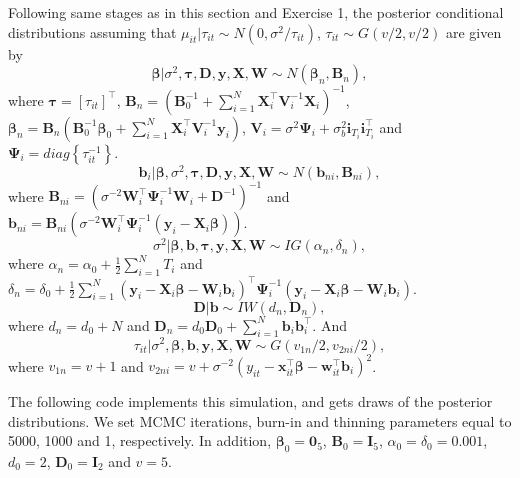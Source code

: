 Following same stages as in this section and Exercise 1, the posterior conditional distributions assuming that $\mu_{it}|\tau_{it}\sim N(0, \sigma^2/\tau_{it})$, $\tau_{it}\sim G(v/2,v/2)$ are given by 
\begin{equation*}
	\bm{\beta}|\sigma^2,\bm{\tau},\bm{D},\bm{y}, \bm{X}, \bm{W} \sim {N}(\bm{\beta}_n,\bm{B}_n), 
\end{equation*}
where $\bm{\tau}=[\tau_{it}]^{\top}$, $\bm{B}_n = (\bm{B}_0^{-1} +\sum_{i=1}^N \bm{X}_i^{\top}\bm{V}_i^{-1}\bm{X}_i)^{-1}$, $\bm{\beta}_n= \bm{B}_n(\bm{B}_0^{-1}\bm{\beta}_0 + \sum_{i=1}^N\bm{X}_i^{\top}\bm{V}_i^{-1}\bm{y}_i)$, $\bm{V}_i=\sigma^2\bm{\Psi}_i+\sigma_{b}^2\bm{i}_{T_i}\bm{i}_{T_i}^{\top}$ and $\bm{\Psi}_i=diag\left\{\tau_{it}^{-1}\right\}$.
\begin{equation*}
	\bm{b}_i|\bm{\beta},\sigma^2,\bm{\tau},\bm{D},\bm{y}, \bm{X}, \bm{W} \sim {N}(\bm{b}_{ni},\bm{B}_{ni}), 
\end{equation*} 
where $\bm{B}_{ni}=(\sigma^{-2}\bm{W}_i^{\top}\bm{\Psi}_i^{-1}\bm{W}_i+\bm{D}^{-1})^{-1}$ and $\bm{b}_{ni}=\bm{B}_{ni}(\sigma^{-2}\bm{W}_i^{\top}\bm{\Psi}_i^{-1}(\bm{y}_i-\bm{X}_i\bm{\beta}))$.
\begin{equation*}
	\sigma^2| \bm{\beta}, \bm{b}, \bm{\tau}, \bm{y}, \bm{X}, \bm{W} \sim {I}{G}(\alpha_n, \delta_n),
\end{equation*}
where $\alpha_n=\alpha_0+\frac{1}{2}\sum_{i=1}^N T_i$ and $\delta_n=\delta_0+\frac{1}{2}\sum_{i=1}^N(\bm{y}_i-\bm{X}_i\bm{\beta}-\bm{W}_i\bm{b}_i)^{\top}\bm{\Psi}_i^{-1}(\bm{y}_i-\bm{X}_i\bm{\beta}-\bm{W}_i\bm{b}_i)$.  
\begin{equation*}
	\bm{D}| \bm{b} \sim {I}{W}(d_n, \bm{D}_n),
\end{equation*}
where $d_n=d_0+N$ and $\bm{D}_n=d_0\bm{D}_0+\sum_{i=1}^N\bm{b}_i\bm{b}_i^{\top}$. And
\begin{equation*}
	\tau_{it}|\sigma^2, \bm{\beta}, \bm{b}, \bm{y}, \bm{X}, \bm{W} \sim {G}(v_{1n}/2, v_{2ni}/2),
\end{equation*}
where $v_{1n}=v+1$ and $v_{2ni}=v+\sigma^{-2}(y_{it}-\bm{x}_{it}^{\top}\bm{\beta}-\bm{w}_{it}^{\top}\bm{b}_i)^2$.

The following code implements this simulation, and gets draws of the posterior distributions. We set MCMC iterations, burn-in and thinning parameters equal to 5000, 1000 and 1, respectively. In addition, $\bm{\beta}_0=\bm{0}_5$, $\bm{B}_0=\bm{I}_5$, $\alpha_0=\delta_0=0.001$, $d_0=2$, $\bm{D}_0=\bm{I}_2$ and $v=5$.

